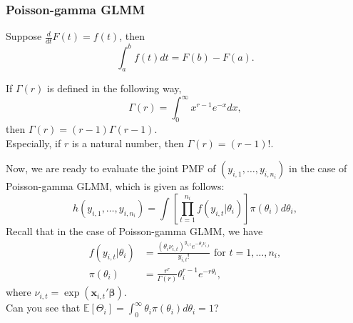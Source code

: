 \documentclass[ignorenonframetext,]{beamer}
\begin{document}
\begin{frame}[allowframebreaks]
\frametitle{Poisson-gamma GLMM}

\begin{theorem}
Suppose $\frac{d}{dt}F(t) = f(t)$, then
$$
\int_a^b f(t) dt = F(b) - F(a).
$$
\end{theorem}

\framebreak

\begin{theorem}
If $\Gamma(r)$ is defined in the following way,
$$
\Gamma(r) = \int_0^\infty x^{r-1} e^{-x} dx,
$$
then $\Gamma(r) = (r-1)\Gamma(r-1)$.\\
Especially, if $r$ is a natural number, then $\Gamma(r) = (r-1)!$.
\end{theorem}

\framebreak

Now, we are ready to evaluate the joint PMF of $(y_{i,1}, \ldots, y_{i,n_i})$ in the case of Poisson-gamma GLMM, which is given as follows:
$$
h(y_{i,1}, \ldots, y_{i,n_i}) = \int \left[ \prod_{t=1}^{n_i} f(y_{i,t}|\theta_i) \right] \pi(\theta_i) d\theta_i,
$$
Recall that in the case of Poisson-gamma GLMM, we have
\begin{align*}
f(y_{i,t}|\theta_i) &= \frac{(\theta_i \nu_{i,t})^{y_{i,t}} e^{-\theta_i \nu_{i,t}}}{y_{i,t}!} \text{ for } t=1,\ldots, n_i, \\
\pi(\theta_i) &= \frac{r^r}{\Gamma(r)} \theta_i^{r-1} e^{-r\theta_i},
\end{align*}
where $\nu_{i,t} = \exp\left(\mathbf{x}_{i,t}'\bm{\beta}\right)$.\\
Can you see that $\mathbb{E}[\Theta_i] = \int_0^\infty \theta_i \pi(\theta_i) d\theta_i = 1$?

\end{frame}
\end{document}
